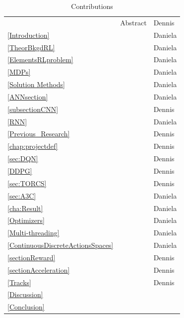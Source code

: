\newpage
\thispagestyle{empty}

\begin{table}[H]
	\caption{Contributions}
	\begin{tabular}{lll}
		& Abstract & Dennis \\
		\ref{Introduction} & \nameref{Introduction} & Daniela \\
		\ref{TheorBkgdRL} & \nameref{TheorBkgdRL} & Daniela \\
		\ref{ElementsRLproblem} & \nameref{ElementsRLproblem} & Daniela \\
		\ref{MDPs} & \nameref{MDPs} & Daniela \\
		\ref{Solution Methods} & \nameref{Solution Methods} & Daniela \\
		\ref{ANNsection} & \nameref{ANNsection} & Daniela \\
		\ref{subsectionCNN} & \nameref{subsectionCNN} & Dennis \\
		\ref{RNN} & \nameref{RNN} & Daniela \\
		\ref{Previous_Research} & \nameref{Previous_Research} & Dennis \\
		\ref{chap:projectdef} & \nameref{chap:projectdef} & Dennis \\
		\ref{sec:DQN} & \nameref{sec:DQN} & Dennis \\
		\ref{DDPG} & \nameref{DDPG} & Dennis \\
		\ref{sec:TORCS} & \nameref{sec:TORCS} & Dennis \\
		\ref{sec:A3C} & \nameref{sec:A3C} & Daniela \\
		\ref{cha:Result} & \nameref{cha:Result} & Daniela \\
		\ref{Optimizers} & \nameref{Optimizers} & Daniela \\
		\ref{Multi-threading} & \nameref{Multi-threading} & Daniela \\
		\ref{ContinuousDiscreteActionsSpaces} & \nameref{ContinuousDiscreteActionsSpaces} & Daniela \\
		\ref{sectionReward} & \nameref{sectionReward} & Dennis \\
		\ref{sectionAcceleration} & \nameref{sectionAcceleration} & Dennis \\
		\ref{Tracks} & \nameref{Tracks} & Dennis \\
		\ref{Discussion} & \nameref{Discussion} &  \\
		\ref{Conclusion} & \nameref{Conclusion} &  
	\end{tabular}
\end{table}